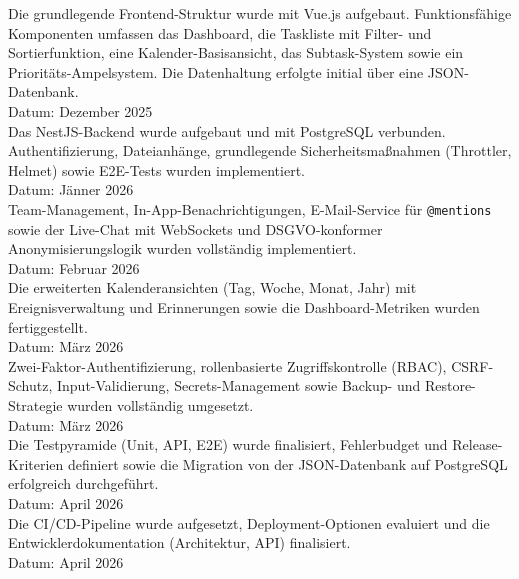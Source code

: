 \label{Ms:Fundamentals}
Die grundlegende Frontend-Struktur wurde mit Vue.js aufgebaut. Funktionsfähige Komponenten umfassen das Dashboard, die Taskliste mit Filter- und Sortierfunktion, eine Kalender-Basisansicht, das Subtask-System sowie ein Prioritäts-Ampelsystem. Die Datenhaltung erfolgte initial über eine JSON-Datenbank.\\
Datum: Dezember 2025\\
 
\label{Ms:Backend}
Das NestJS-Backend wurde aufgebaut und mit PostgreSQL verbunden. Authentifizierung, Dateianhänge, grundlegende Sicherheitsmaßnahmen (Throttler, Helmet) sowie E2E-Tests wurden implementiert.\\
Datum: Jänner 2026\\
 
\label{Ms:Realtime}
Team-Management, In-App-Benachrichtigungen, E-Mail-Service für \texttt{@mentions} sowie der Live-Chat mit WebSockets und DSGVO-konformer Anonymisierungslogik wurden vollständig implementiert.\\
Datum: Februar 2026\\
 
\label{Ms:Kalender}
Die erweiterten Kalenderansichten (Tag, Woche, Monat, Jahr) mit Ereignisverwaltung und Erinnerungen sowie die Dashboard-Metriken wurden fertiggestellt.\\
Datum: März 2026\\
 
\label{Ms:Sicherheit}
Zwei-Faktor-Authentifizierung, rollenbasierte Zugriffskontrolle (RBAC), CSRF-Schutz, Input-Validierung, Secrets-Management sowie Backup- und Restore-Strategie wurden vollständig umgesetzt.\\
Datum: März 2026\\
 
\label{Ms:Tests}
Die Testpyramide (Unit, API, E2E) wurde finalisiert, Fehlerbudget und Release-Kriterien definiert sowie die Migration von der JSON-Datenbank auf PostgreSQL erfolgreich durchgeführt.\\
Datum: April 2026\\
 
\label{Ms:Deployment}
Die CI/CD-Pipeline wurde aufgesetzt, Deployment-Optionen evaluiert und die Entwicklerdokumentation (Architektur, API) finalisiert.\\
Datum: April 2026\\
 
